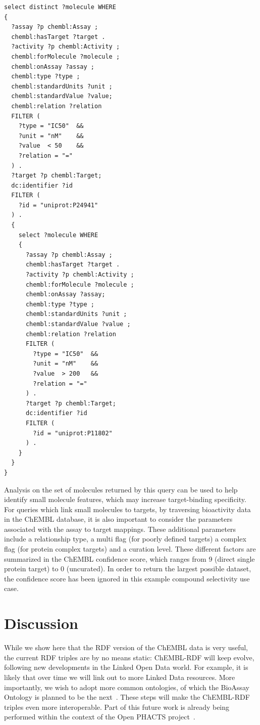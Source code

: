 \documentclass[10pt]{bmc_article}
\newenvironment{bmcformat}{\begin{raggedright}\baselineskip20pt\sloppy\setboolean{publ}{false}}{\end{raggedright}\baselineskip20pt\sloppy}
\begin{document}
\begin{bmcformat}
\begin{tiny}
\begin{verbatim}
select distinct ?molecule WHERE 
{ 
  ?assay ?p chembl:Assay ;
  chembl:hasTarget ?target .
  ?activity ?p chembl:Activity ;
  chembl:forMolecule ?molecule ;
  chembl:onAssay ?assay ;
  chembl:type ?type ;
  chembl:standardUnits ?unit ;
  chembl:standardValue ?value;
  chembl:relation ?relation
  FILTER (
    ?type = "IC50"  &&
    ?unit = "nM"    &&
    ?value  < 50    &&
    ?relation = "="
  ) .
  ?target ?p chembl:Target;
  dc:identifier ?id
  FILTER (
    ?id = "uniprot:P24941"
  ) .
  { 
    select ?molecule WHERE 
    {
      ?assay ?p chembl:Assay ;
      chembl:hasTarget ?target .
      ?activity ?p chembl:Activity ;
      chembl:forMolecule ?molecule ;
      chembl:onAssay ?assay;
      chembl:type ?type ;
      chembl:standardUnits ?unit ;
      chembl:standardValue ?value ;
      chembl:relation ?relation
      FILTER (
        ?type = "IC50"  &&
        ?unit = "nM"    &&
        ?value  > 200   &&
        ?relation = "="
      ) .
      ?target ?p chembl:Target;
      dc:identifier ?id
      FILTER (
        ?id = "uniprot:P11802"
      ) .
    }
  }
}
\end{verbatim}
\end{tiny}

Analysis on the set of molecules returned by this query can be used to help identify small 
molecule features, which may increase target-binding specificity. For queries which link 
small molecules to targets, by traversing bioactivity data in the ChEMBL database, it is 
also important to consider the parameters associated with the assay to target mappings. 
These additional parameters include a relationship type, a multi flag (for poorly defined
targets) a complex flag (for protein complex targets) and a curation level. These different 
factors are summarized in the ChEMBL confidence score, which ranges from 9 (direct single 
protein target) to 0 (uncurated). In order to return the largest possible dataset, the 
confidence score has been ignored in this example compound selectivity use case.

\section*{Discussion}

While we show here that the RDF version of the ChEMBL data is very useful, the current RDF triples are by no means static: ChEMBL-RDF
will keep evolve, following new developments in the Linked Open Data world. For example, it is likely that over time we will link out
to more Linked Data resources. More importantly, we wish to adopt more common ontologies, of which the BioAssay Ontology is planned
to be the next~\cite{Visser2011}. These steps will make the ChEMBL-RDF triples even more interoperable. Part of this future work
is already being performed within the context of the Open PHACTS project~\cite{Williams2012}.


\end{bmcformat}
\end{document}
